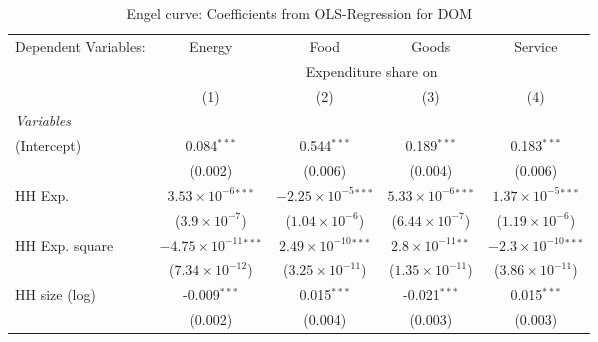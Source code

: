 
\begin{table}[htbp!]
   \centering
   \small
   \begin{adjustbox}{width = 1\textwidth, max height = 0.95\textheight, center}
      \begin{threeparttable}[b]
         \caption{\label{tab:Engel_parametric_DOM} Engel curve: Coefficients from OLS-Regression for DOM}
         \begin{tabular}{lcccc}
            \tabularnewline \midrule \midrule
            Dependent Variables: & Energy                          & Food                           & Goods                         & Service\\  
             & \multicolumn{4}{c}{Expenditure share on} \\ 
                                 & (1)                             & (2)                            & (3)                           & (4)\\  
            \midrule
            \emph{Variables}\\
            (Intercept)          & 0.084$^{***}$                   & 0.544$^{***}$                  & 0.189$^{***}$                 & 0.183$^{***}$\\   
                                 & (0.002)                         & (0.006)                        & (0.004)                       & (0.006)\\   
            HH Exp.              & $3.53\times 10^{-6}$$^{***}$    & $-2.25\times 10^{-5}$$^{***}$  & $5.33\times 10^{-6}$$^{***}$  & $1.37\times 10^{-5}$$^{***}$\\    
                                 & ($3.9\times 10^{-7}$)           & ($1.04\times 10^{-6}$)         & ($6.44\times 10^{-7}$)        & ($1.19\times 10^{-6}$)\\    
            HH Exp. square       & $-4.75\times 10^{-11}$$^{***}$  & $2.49\times 10^{-10}$$^{***}$  & $2.8\times 10^{-11}$$^{**}$   & $-2.3\times 10^{-10}$$^{***}$\\    
                                 & ($7.34\times 10^{-12}$)         & ($3.25\times 10^{-11}$)        & ($1.35\times 10^{-11}$)       & ($3.86\times 10^{-11}$)\\    
            HH size (log)        & -0.009$^{***}$                  & 0.015$^{***}$                  & -0.021$^{***}$                & 0.015$^{***}$\\   
                                 & (0.002)                         & (0.004)                        & (0.003)                       & (0.003)\\   

\end{tabular}
\end{threeparttable}
\end{adjustbox}
\end{table}

